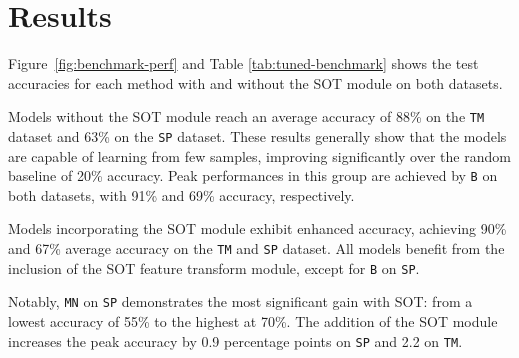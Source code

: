 \section{Results}



Figure~\ref{fig:benchmark-perf} and Table \ref{tab:tuned-benchmark} shows the test accuracies for each method with and without the SOT module on both datasets.

Models without the SOT module reach an average accuracy of 88\% on the \texttt{TM} dataset and 63\% on the \texttt{SP} dataset. These results generally show that the models are capable of learning from few samples, improving significantly over the random baseline of 20\% accuracy. Peak performances in this group are achieved by \texttt{B} on both datasets, with 91\% and 69\% accuracy, respectively.

Models incorporating the SOT module exhibit enhanced accuracy, achieving 90\% and 67\% average accuracy on the \texttt{TM} and \texttt{SP} dataset. All models benefit from the inclusion of the SOT feature transform module, except for \texttt{B} on \texttt{SP}. 

Notably, \texttt{MN} on \texttt{SP} demonstrates the most significant gain with SOT: from a lowest accuracy of 55\% to the highest at 70\%. The addition of the SOT module increases the peak accuracy by 0.9 percentage points on \texttt{SP} and 2.2 on \texttt{TM}.

